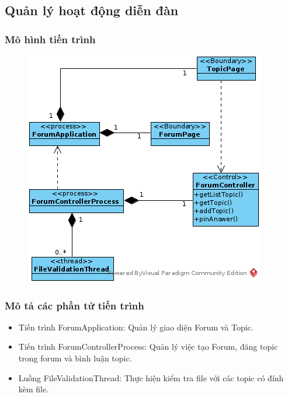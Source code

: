 \documentclass[./../main.tex]{subfiles}
\begin{document}
\subsection{Quản lý hoạt động diễn đàn}

\subsubsection{Mô hình tiến trình}

\begin{figure}[H]
	\centering
	\includegraphics[width=\linewidth]{./images/pv_manage_forum.png}
\end{figure}

\subsubsection{Mô tả các phần tử tiến trình}
\begin{itemize}
	\item Tiến trình ForumApplication: Quản lý giao diện Forum và Topic.
	\item Tiến trình ForumControllerProcess: Quản lý việc tạo Forum, đăng topic trong forum và bình luận topic.
	\item Luồng FileValidationThread: Thực hiện kiểm tra file với các topic có đính kèm file.
\end{itemize}
\end{document}
